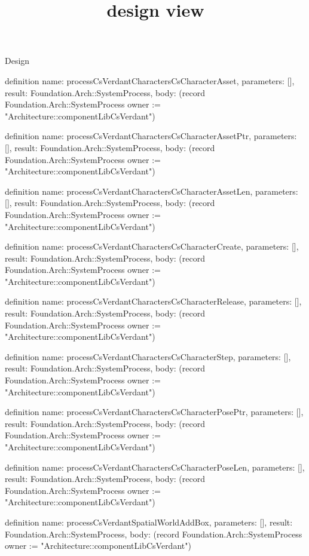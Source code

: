 \begin{lexlean}{Design}
\title{design view}
\begin{semanticmodule}
definition{
  name: processCsVerdantCharactersCsCharacterAsset,
  parameters: [],
  result: Foundation.Arch::SystemProcess,
  body: (record Foundation.Arch::SystemProcess {owner := "Architecture::componentLibCsVerdant"})
}

definition{
  name: processCsVerdantCharactersCsCharacterAssetPtr,
  parameters: [],
  result: Foundation.Arch::SystemProcess,
  body: (record Foundation.Arch::SystemProcess {owner := "Architecture::componentLibCsVerdant"})
}

definition{
  name: processCsVerdantCharactersCsCharacterAssetLen,
  parameters: [],
  result: Foundation.Arch::SystemProcess,
  body: (record Foundation.Arch::SystemProcess {owner := "Architecture::componentLibCsVerdant"})
}

definition{
  name: processCsVerdantCharactersCsCharacterCreate,
  parameters: [],
  result: Foundation.Arch::SystemProcess,
  body: (record Foundation.Arch::SystemProcess {owner := "Architecture::componentLibCsVerdant"})
}

definition{
  name: processCsVerdantCharactersCsCharacterRelease,
  parameters: [],
  result: Foundation.Arch::SystemProcess,
  body: (record Foundation.Arch::SystemProcess {owner := "Architecture::componentLibCsVerdant"})
}

definition{
  name: processCsVerdantCharactersCsCharacterStep,
  parameters: [],
  result: Foundation.Arch::SystemProcess,
  body: (record Foundation.Arch::SystemProcess {owner := "Architecture::componentLibCsVerdant"})
}

definition{
  name: processCsVerdantCharactersCsCharacterPosePtr,
  parameters: [],
  result: Foundation.Arch::SystemProcess,
  body: (record Foundation.Arch::SystemProcess {owner := "Architecture::componentLibCsVerdant"})
}

definition{
  name: processCsVerdantCharactersCsCharacterPoseLen,
  parameters: [],
  result: Foundation.Arch::SystemProcess,
  body: (record Foundation.Arch::SystemProcess {owner := "Architecture::componentLibCsVerdant"})
}

definition{
  name: processCsVerdantSpatialWorldAddBox,
  parameters: [],
  result: Foundation.Arch::SystemProcess,
  body: (record Foundation.Arch::SystemProcess {owner := "Architecture::componentLibCsVerdant"})
}


\end{semanticmodule}
\end{lexlean}
